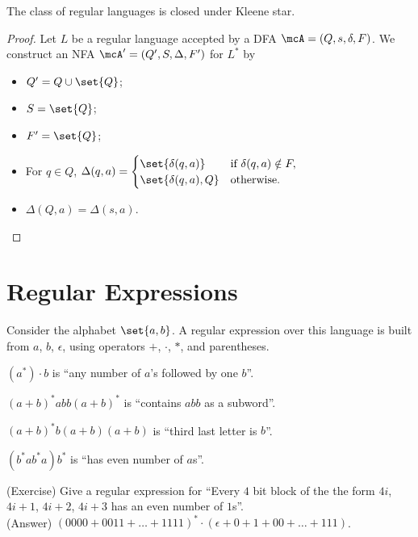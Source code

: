 
\begin{theorem} \label{thm:closure:kleene}
    The class of regular languages is closed under Kleene star.
\end{theorem}
\begin{proof}
    Let $L$ be a regular language accepted by a DFA
    $\mcA = (Q, s, \delta, F)$.
    We construct an NFA $\mcA' = (Q', S, \Delta, F')$ for $L^*$ by
    \begin{itemize}
        \item $Q' = Q \cup \set{Q}$;
        \item $S = \set{Q}$;
        \item $F' = \set{Q}$;
        \item For $q \in Q$, $\Delta(q, a) = \begin{cases}
            \set{\delta(q, a)} & \text{if } \delta(q, a) \notin F, \\
            \set{\delta(q, a), Q} & \text{otherwise}.
        \end{cases}$
        \item $\Delta(Q, a) = \Delta(s, a)$.
    \end{itemize}
\end{proof}

\section{Regular Expressions} \label{sec:regex}
Consider the alphabet $\set{a, b}$.
A regular expression over this language is built from $a$, $b$, $\epsilon$,
using operators $+$, $\cdot$, $*$, and parentheses.
\begin{examples}
    \item $(a^*)\cdot b$ is ``any number of $a$'s followed by one $b$''.
    \item $(a + b)^*abb(a + b)^*$ is ``contains $abb$ as a subword''.
    \item $(a+b)^*b(a+b)(a+b)$ is ``third last letter is $b$''.
    \item $(b^*ab^*a)b^*$ is ``has even number of $a$s''.
    \item (Exercise) Give a regular expression for ``Every $4$ bit block of
    the the form $4i$, $4i+1$, $4i+2$, $4i+3$ has an even number of $1$s''.
    \\
    (Answer) $(0000 + 0011 + \dots + 1111)^*\cdot(\epsilon + 0 + 1 + 00 + \dots + 111)$.
\end{examples}

